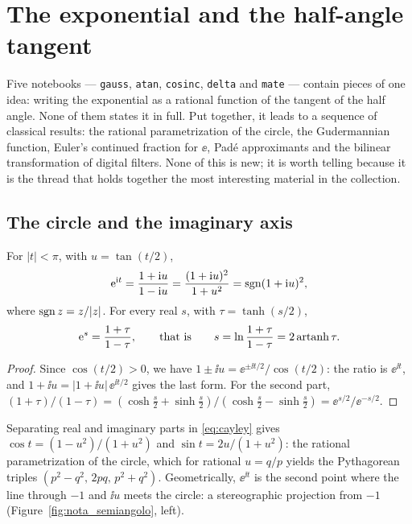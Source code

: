 \section{The exponential and the half-angle tangent}
\label{sec:semiangolo}

Five notebooks --- \texttt{gauss}, \texttt{atan}, \texttt{cosinc},
\texttt{delta} and \texttt{mate} --- contain pieces of one idea: writing the
exponential as a rational function of the tangent of the half angle. None of
them states it in full. Put together, it leads to a sequence of classical
results: the rational parametrization of the circle, the Gudermannian
function, Euler's continued fraction for $\ee$, Pad\'e approximants and the
bilinear transformation of digital filters. None of this is new; it is worth
telling because it is the thread that holds together the most interesting
material in the collection.

\subsection{The circle and the imaginary axis}

\begin{prop}\label{prop:semiangolo}
For $|t|<\pi$, with $u=\tan(t/2)$,
\begin{equation}\label{eq:cayley}
  \mathrm{e}^{\mathrm{i} t}=\frac{1+\mathrm{i} u}{1-\mathrm{i} u}=\frac{(1+\mathrm{i} u)^2}{1+u^2}
  =\operatorname{sgn}(1+\mathrm{i} u)^2 ,
\end{equation}
where $\operatorname{sgn} z=z/|z|$. For every real $s$, with $\tau=\tanh(s/2)$,
\begin{equation}\label{eq:tanh}
  \mathrm{e}^{s}=\frac{1+\tau}{1-\tau},
  \qquad\text{that is}\qquad
  s=\ln\frac{1+\tau}{1-\tau}=2\operatorname{artanh}\tau .
\end{equation}
\end{prop}

\begin{proof}
Since $\cos(t/2)>0$, we have $1\pm\ii u=\ee^{\pm\ii t/2}/\cos(t/2)$: the
ratio is $\ee^{\ii t}$, and $1+\ii u=|1+\ii u|\,\ee^{\ii t/2}$ gives the last
form. For the second part,
$(1+\tau)/(1-\tau)=(\cosh\frac s2+\sinh\frac s2)/(\cosh\frac s2-\sinh\frac s2)
=\ee^{s/2}/\ee^{-s/2}$.
\end{proof}

Separating real and imaginary parts in \eqref{eq:cayley} gives
$\cos t=(1-u^2)/(1+u^2)$ and $\sin t=2u/(1+u^2)$: the rational
parametrization of the circle, which for rational $u=q/p$ yields the
Pythagorean triples $(p^2-q^2,\,2pq,\,p^2+q^2)$. Geometrically, $\ee^{\ii t}$
is the second point where the line through $-1$ and $\ii u$ meets the circle:
a stereographic projection from $-1$ (Figure~\ref{fig:nota_semiangolo},
left).

